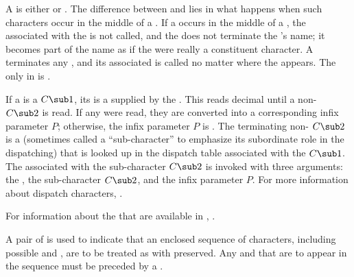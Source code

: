 A  is either  or .
The difference between  and   
lies in what happens when such characters occur in the middle of a .  
If a   occurs in the middle of a ,
the  associated 
with the   is not called,
and the
  does not terminate the 's name; it
becomes part of the name as if the  were really a constituent
character.  A   terminates any ,
and its associated 
is called no matter where the  appears.
The only   in  
is .

If a  is a  $C\sub 1$,
its  is a  supplied by the .
This  reads decimal   until a non-
$C\sub 2$ is read.
If any  were read,
they are converted into a corresponding  infix parameter $P$;
otherwise, the infix parameter $P$ is \nil.  
The terminating non- $C\sub 2$ is a  
(sometimes called a ``sub-character'' to emphasize its subordinate role in the dispatching)
that is looked up in the dispatch table associated with
the  $C\sub 1$.
The  associated with the sub-character $C\sub 2$ 
is invoked with three arguments:
     the ,
     the sub-character $C\sub 2$,
 and the infix parameter $P$.
For more information about dispatch characters,
.

For information about the  
that are available in ,
\seesection\StandardMacroChars.

\endsubsubsection%


A pair of  
is used to indicate that an enclosed sequence of characters,
including possible  and  ,
are to be treated as   
with  preserved.
Any  and   
that are to appear in the sequence must be preceded by a  
.  

